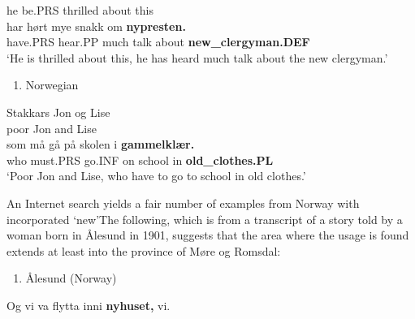 he  be.PRS  thrilled  about  this\\ %


\ea\label{}
\gll har  hørt  mye  snakk  om  \textbf{nypresten.} \\


have.PRS  hear.PP  much  talk  about   \textbf{new\_clergyman.DEF} \\ %


‘He is thrilled about this, he has heard much talk about the new clergyman.’
\z


\begin{enumerate} %
\item 
Norwegian 

\end{enumerate} %
\ea\label{}
\gll Stakkars  Jon  og  Lise\\


poor  Jon  and  Lise\\ %


\ea\label{}
\gll som  må  gå  på  skolen  i  \textbf{gammelklær.}\\


who  must.PRS  go.INF  on  school  in  \textbf{old\_clothes.PL}\\ %


‘Poor Jon and Lise, who have to go to school in old clothes.’
\z


An Internet search yields a fair number of examples from Norway with incorporated  ‘new’The following, which is from a transcript of a story told by a woman born in Ålesund in 1901, suggests that the area where the usage is found extends at least into the province of Møre og Romsdal:

\begin{enumerate} %
\item 
Ålesund (Norway)

\end{enumerate} %
\ea\label{}
\gll Og  vi  va  flytta  inni  \textbf{nyhuset,} vi.  \\


